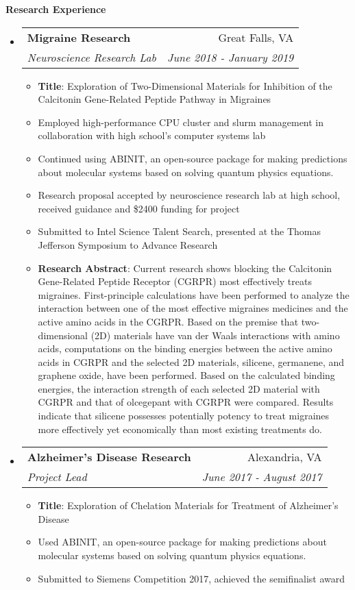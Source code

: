 \documentclass[letterpaper,11pt]{article}
\makeatletter
\newcommand{\resitem}[1]{\item #1 \vspace{-2pt}}
\newcommand{\resheading}[1]{{\large \colorbox{mygrey}{\begin{minipage}{\textwidth}{\textbf{#1 \vphantom{p\^{E}}}}\end{minipage}}}}
\newcommand{\ressubheading}[4]{
\begin{tabular*}{7.0in}{l@{\extracolsep{\fill}}r}
		\textbf{#1} & #2 \\
		\textit{#3} & \textit{#4} \\
\end{tabular*}\vspace{-6pt}}
\makeatother
\begin{document}
\resheading{Research Experience}
\begin{itemize}
\item
	\ressubheading{Migraine Research}{Great Falls, VA}{Neuroscience Research Lab}{June 2018 - January 2019}
	\begin{itemize}
		\resitem{\textbf{Title}: Exploration of Two-Dimensional Materials for Inhibition of the Calcitonin Gene-Related Peptide Pathway in Migraines}
	    \resitem{Employed high-performance CPU cluster and slurm management in collaboration with high school's computer systems lab}
	    \resitem{Continued using ABINIT, an open-source package for making predictions about molecular systems based on solving quantum physics equations.}
	    \resitem{Research proposal accepted by neuroscience research lab at high school, received guidance and \$2400 funding for project}
	    \resitem{Submitted to Intel Science Talent Search, presented at the Thomas Jefferson Symposium to Advance Research}
		\resitem{\textbf{Research Abstract}: \footnotesize{Current research shows blocking the Calcitonin Gene-Related Peptide Receptor (CGRPR) most effectively treats migraines. First-principle calculations have been performed to analyze the interaction between one of the most effective migraines medicines and the active amino acids in the CGRPR. Based on the premise that two-dimensional (2D) materials have van der Waals interactions with amino acids, computations on the binding energies between the active amino acids in CGRPR and the selected 2D materials, silicene, germanene, and graphene oxide, have been performed. Based on the calculated binding energies, the interaction strength of each selected 2D material with CGRPR and that of olcegepant with CGRPR were compared. Results indicate that silicene possesses potentially potency to treat migraines more effectively yet economically than most existing treatments do.}}
	\end{itemize}
\item
	\ressubheading{Alzheimer's Disease Research}{Alexandria, VA}{Project Lead}{June 2017 - August 2017}
	\begin{itemize}
	    \resitem{\textbf{Title}: Exploration of Chelation Materials for Treatment of Alzheimer's Disease}
		\resitem{Used ABINIT, an open-source package for making predictions about molecular systems based on solving quantum physics equations.}
		\resitem{Submitted to Siemens Competition 2017, achieved the semifinalist award}

\end{itemize}
\end{itemize}
\end{document}
